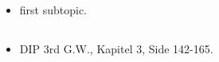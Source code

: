 \subsection{\subtopics}

\begin{itemize}
	\item first subtopic.
\end{itemize}

\subsection{\curriculum}

\begin{itemize}
	\item DIP 3rd G.W., Kapitel 3, Side 142-165.
\end{itemize}